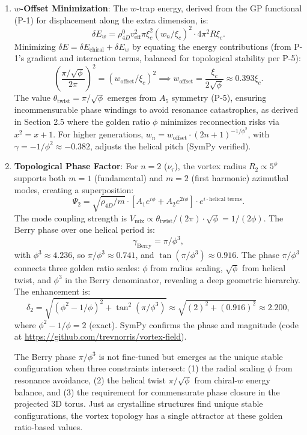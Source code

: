 \begin{enumerate}
\item \textbf{$w$-Offset Minimization}: The $w$-trap energy, derived from the GP functional (P-1) for displacement along the extra dimension, is:
   \[
   \delta E_w = \rho_{4D}^0 v_{\text{eff}}^2 \pi \xi_c^2 (w_n / \xi_c)^2 \cdot 4\pi^2 R \xi_c.
   \]
   Minimizing $\delta E = \delta E_{\text{chiral}} + \delta E_w$ by equating the energy contributions (from P-1's gradient and interaction terms, balanced for topological stability per P-5):
   \[
   \left( \frac{\pi / \sqrt{\phi}}{2\pi} \right)^2 = (w_{\text{offset}} / \xi_c)^2 \implies w_{\text{offset}} = \frac{\xi_c}{2 \sqrt{\phi}} \approx 0.393 \xi_c.
   \]
   The value $\theta_{\text{twist}} = \pi / \sqrt{\phi}$ emerges from $A_5$ symmetry (P-5), ensuring incommensurable phase windings to avoid resonance catastrophes, as derived in Section 2.5 where the golden ratio $\phi$ minimizes reconnection risks via $x^2 = x + 1$. For higher generations, $w_n = w_{\text{offset}} \cdot (2n+1)^{-1/\phi^2}$, with $\gamma = -1/\phi^2 \approx -0.382$, adjusts the helical pitch (SymPy verified).

\item \textbf{Topological Phase Factor}: For $n=2$ ($\nu_\tau$), the vortex radius $R_2 \propto 5^\phi$ supports both $m=1$ (fundamental) and $m=2$ (first harmonic) azimuthal modes, creating a superposition:
   \[
   \Psi_2 = \sqrt{\rho_{4D}/m} \cdot [A_1 e^{i\phi} + A_2 e^{2i\phi}] \cdot e^{i \cdot \text{helical terms}}.
   \]
   The mode coupling strength is $V_{\text{mix}} \propto \theta_{\text{twist}}/(2\pi) \cdot \sqrt{\phi} = 1/(2\phi)$. The Berry phase over one helical period is:
   \[
   \gamma_{\text{Berry}} = \pi / \phi^3,
   \]
   with $\phi^3 \approx 4.236$, so $\pi / \phi^3 \approx 0.741$, and $\tan(\pi / \phi^3) \approx 0.916$. The phase $\pi/\phi^3$ connects three golden ratio scales: $\phi$ from radius scaling, $\sqrt{\phi}$ from helical twist, and $\phi^3$ in the Berry denominator, revealing a deep geometric hierarchy. The enhancement is:
   \[
   \delta_2 = \sqrt{(\phi^2 - 1/\phi)^2 + \tan^2(\pi / \phi^3)} \approx \sqrt{(2)^2 + (0.916)^2} \approx 2.200,
   \]
   where $\phi^2 - 1/\phi = 2$ (exact). SymPy confirms the phase and magnitude (code at \url{https://github.com/trevnorris/vortex-field}).

   The Berry phase $\pi/\phi^3$ is not fine-tuned but emerges as the unique stable configuration when three constraints intersect: (1) the radial scaling $\phi$ from resonance avoidance, (2) the helical twist $\pi/\sqrt{\phi}$ from chiral-$w$ energy balance, and (3) the requirement for commensurate phase closure in the projected 3D torus. Just as crystalline structures find unique stable configurations, the vortex topology has a single attractor at these golden ratio-based values.


\end{enumerate}
